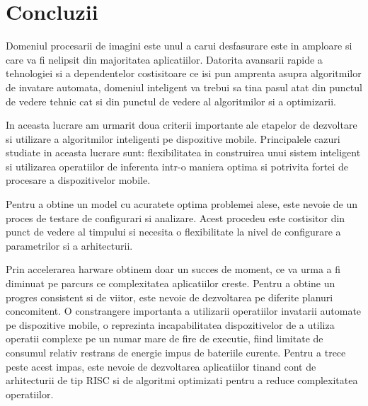 \chapter{Concluzii}

Domeniul procesarii de imagini este unul a carui desfasurare este in amploare si care va fi nelipsit din majoritatea aplicatiilor. Datorita avansarii rapide a tehnologiei si a dependentelor costisitoare ce isi pun amprenta asupra algoritmilor de invatare automata, domeniul inteligent va trebui sa tina pasul atat din punctul de vedere tehnic cat si din punctul de vedere al algoritmilor si a optimizarii. \newline

In aceasta lucrare am urmarit doua criterii importante ale etapelor de dezvoltare si utilizare a algoritmilor inteligenti pe dispozitive mobile. Principalele cazuri studiate in aceasta lucrare sunt: flexibilitatea in construirea unui sistem inteligent si utilizarea operatiilor de inferenta intr-o maniera optima si potrivita fortei de procesare a dispozitivelor mobile.\newline

Pentru a obtine un model cu acuratete optima problemei alese, este nevoie de un proces de testare de configurari si analizare. Acest procedeu este costisitor din punct de vedere al timpului si necesita o flexibilitate la nivel de configurare a parametrilor si a arhitecturii.\newline

Prin accelerarea harware obtinem doar un succes de moment, ce va urma a fi diminuat pe parcurs ce complexitatea aplicatiilor creste. Pentru a obtine un progres consistent si de viitor, este nevoie de dezvoltarea pe diferite planuri concomitent. O constrangere importanta a utilizarii operatiilor invatarii automate pe dispozitive mobile, o reprezinta incapabilitatea dispozitivelor de a utiliza operatii complexe pe un numar mare de fire de executie, fiind limitate de consumul relativ restrans de energie impus de bateriile curente. Pentru a trece peste acest impas, este nevoie de dezvoltarea aplicatiilor tinand cont de arhitecturii de tip RISC si de algoritmi optimizati pentru a reduce complexitatea operatiilor.





